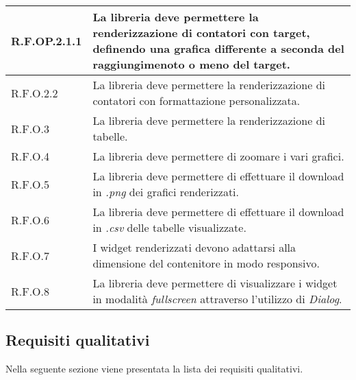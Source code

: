 \begin{center}
\begin{longtable}{|p{2.5cm}|p{10cm}|}
        \hline
        R.F.OP.2.1.1       & La libreria deve permettere la renderizzazione di contatori con target, definendo una grafica
        differente a seconda del raggiungimenoto o meno del target.                                                             \\
        \hline
        R.F.O.2.2          & La libreria deve permettere la renderizzazione di contatori con formattazione personalizzata.      \\
        \hline
        R.F.O.3            & La libreria deve permettere la renderizzazione di tabelle.                                         \\
        \hline
        R.F.O.4            & La libreria deve permettere di zoomare i vari grafici.                                             \\
        \hline
        R.F.O.5            & La libreria deve permettere di effettuare il download in \textit{.png} dei grafici renderizzati.   \\
        \hline
        R.F.O.6            & La libreria deve permettere di effettuare il download in \textit{.csv} delle tabelle visualizzate. \\
        \hline
        R.F.O.7            & I widget renderizzati devono adattarsi alla dimensione del contenitore in modo responsivo.         \\
        \hline
        R.F.O.8            & La libreria deve permettere di visualizzare i widget in modalità \textit{fullscreen} attraverso
        l'utilizzo di \textit{Dialog}.                                                                                          \\
    \end{longtable}
    \label{tab:requisiti_funzionali}
\end{center}

\subsection{Requisiti qualitativi}
Nella seguente sezione viene presentata la lista dei requisiti qualitativi.

